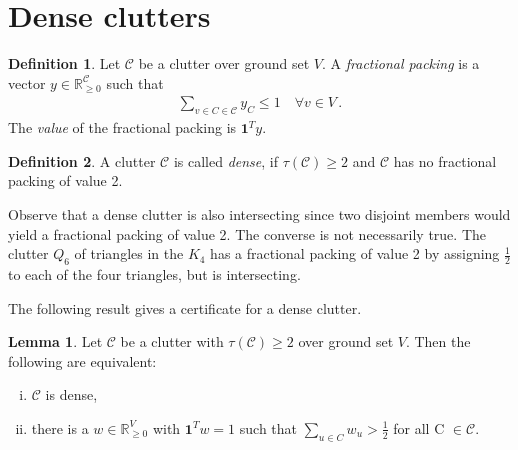 \documentclass[a4paper, 12pt]{scrbook}
\theoremstyle{definition}
\newtheorem*{definition}{Definition}
\newtheorem{lemma}[theorem]{Lemma}
\newcommand*{\IR}{\ensuremath{\mathbb{R}}}
\begin{document}
\section{Dense clutters}
\begin{definition}
    Let $\mathcal{C}$ be a clutter over ground set $V$.
    A \emph{fractional packing} is a vector $y \in \IR_{\geq0}^{\mathcal{C}}$ such that
    \begin{align*}
        \sum_{v \in C \in \mathcal{C}} y_C \leq 1 \quad \forall v \in V \,.
    \end{align*}
    The \emph{value} of the fractional packing is $\textbf{1}^Ty$.
\end{definition}
\begin{definition}
    A clutter $\mathcal{C}$ is called \emph{dense}, if $\tau(\mathcal{C}) \geq 2$ and $\mathcal{C}$ has no fractional packing of value 2.
\end{definition}

Observe that a dense clutter is also intersecting since two disjoint members would yield a fractional packing of value 2.
The converse is not necessarily true.
The clutter $Q_6$ of triangles in the $K_4$ has a fractional packing of value 2 by assigning $\frac 12$ to each of the four triangles, but is intersecting.

The following result gives a certificate for a dense clutter.
\begin{lemma}
    Let $\mathcal{C}$ be a clutter with $\tau(\mathcal{C})\geq 2$ over ground set $V$.
    Then the following are equivalent:
    \leavevmode
    \begin{enumerate}[(i)]
        \item $\mathcal{C}$ is dense,
        \item there is a $w \in \IR_{\geq 0}^V$ with $\textbf{1}^Tw=1$ such that $\sum_{u \in C} w_u > \frac 12$ for all C $\in \mathcal{C}$.
    \end{enumerate}
\end{lemma}
\end{document}
